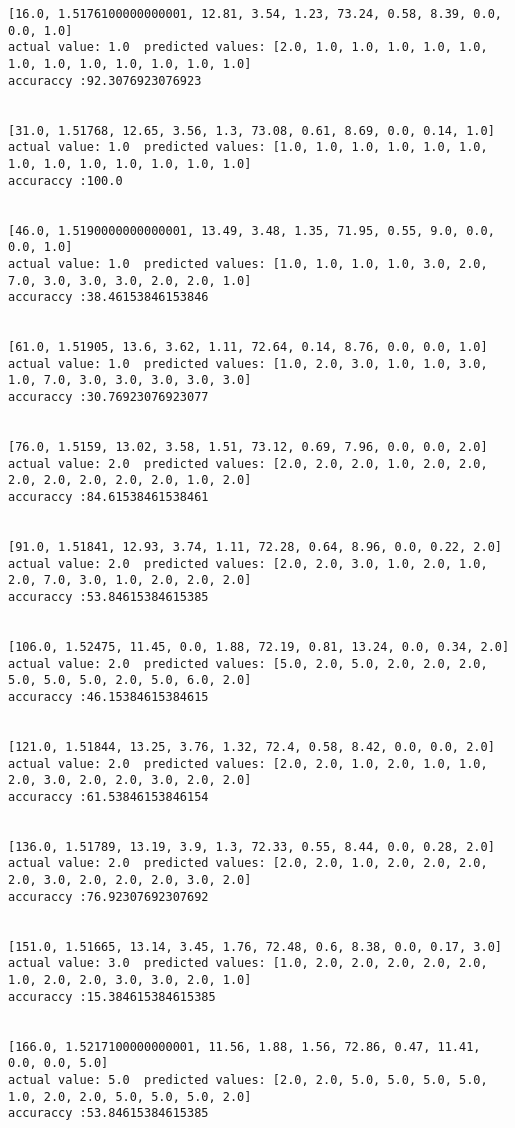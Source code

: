 \documentclass[11pt]{article}
\begin{document}
\begin{Verbatim}[commandchars=\\\{\}]
[16.0, 1.5176100000000001, 12.81, 3.54, 1.23, 73.24, 0.58, 8.39, 0.0, 0.0, 1.0]
actual value: 1.0  predicted values: [2.0, 1.0, 1.0, 1.0, 1.0, 1.0, 1.0, 1.0, 1.0, 1.0, 1.0, 1.0, 1.0]
accuraccy :92.3076923076923


[31.0, 1.51768, 12.65, 3.56, 1.3, 73.08, 0.61, 8.69, 0.0, 0.14, 1.0]
actual value: 1.0  predicted values: [1.0, 1.0, 1.0, 1.0, 1.0, 1.0, 1.0, 1.0, 1.0, 1.0, 1.0, 1.0, 1.0]
accuraccy :100.0


[46.0, 1.5190000000000001, 13.49, 3.48, 1.35, 71.95, 0.55, 9.0, 0.0, 0.0, 1.0]
actual value: 1.0  predicted values: [1.0, 1.0, 1.0, 1.0, 3.0, 2.0, 7.0, 3.0, 3.0, 3.0, 2.0, 2.0, 1.0]
accuraccy :38.46153846153846


[61.0, 1.51905, 13.6, 3.62, 1.11, 72.64, 0.14, 8.76, 0.0, 0.0, 1.0]
actual value: 1.0  predicted values: [1.0, 2.0, 3.0, 1.0, 1.0, 3.0, 1.0, 7.0, 3.0, 3.0, 3.0, 3.0, 3.0]
accuraccy :30.76923076923077


[76.0, 1.5159, 13.02, 3.58, 1.51, 73.12, 0.69, 7.96, 0.0, 0.0, 2.0]
actual value: 2.0  predicted values: [2.0, 2.0, 2.0, 1.0, 2.0, 2.0, 2.0, 2.0, 2.0, 2.0, 2.0, 1.0, 2.0]
accuraccy :84.61538461538461


[91.0, 1.51841, 12.93, 3.74, 1.11, 72.28, 0.64, 8.96, 0.0, 0.22, 2.0]
actual value: 2.0  predicted values: [2.0, 2.0, 3.0, 1.0, 2.0, 1.0, 2.0, 7.0, 3.0, 1.0, 2.0, 2.0, 2.0]
accuraccy :53.84615384615385


[106.0, 1.52475, 11.45, 0.0, 1.88, 72.19, 0.81, 13.24, 0.0, 0.34, 2.0]
actual value: 2.0  predicted values: [5.0, 2.0, 5.0, 2.0, 2.0, 2.0, 5.0, 5.0, 5.0, 2.0, 5.0, 6.0, 2.0]
accuraccy :46.15384615384615


[121.0, 1.51844, 13.25, 3.76, 1.32, 72.4, 0.58, 8.42, 0.0, 0.0, 2.0]
actual value: 2.0  predicted values: [2.0, 2.0, 1.0, 2.0, 1.0, 1.0, 2.0, 3.0, 2.0, 2.0, 3.0, 2.0, 2.0]
accuraccy :61.53846153846154


[136.0, 1.51789, 13.19, 3.9, 1.3, 72.33, 0.55, 8.44, 0.0, 0.28, 2.0]
actual value: 2.0  predicted values: [2.0, 2.0, 1.0, 2.0, 2.0, 2.0, 2.0, 3.0, 2.0, 2.0, 2.0, 3.0, 2.0]
accuraccy :76.92307692307692


[151.0, 1.51665, 13.14, 3.45, 1.76, 72.48, 0.6, 8.38, 0.0, 0.17, 3.0]
actual value: 3.0  predicted values: [1.0, 2.0, 2.0, 2.0, 2.0, 2.0, 1.0, 2.0, 2.0, 3.0, 3.0, 2.0, 1.0]
accuraccy :15.384615384615385


[166.0, 1.5217100000000001, 11.56, 1.88, 1.56, 72.86, 0.47, 11.41, 0.0, 0.0, 5.0]
actual value: 5.0  predicted values: [2.0, 2.0, 5.0, 5.0, 5.0, 5.0, 1.0, 2.0, 2.0, 5.0, 5.0, 5.0, 2.0]
accuraccy :53.84615384615385



\end{Verbatim}
\end{document}
